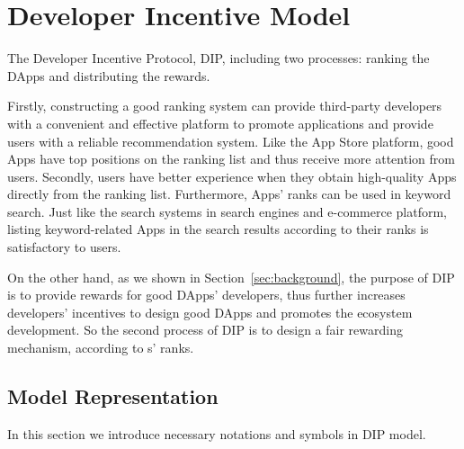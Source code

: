 \section{Developer Incentive Model}
\noindent
The Developer Incentive Protocol, DIP, including two processes: ranking the DApps and distributing the rewards.

Firstly, constructing a good ranking system can provide third-party developers
with a convenient and effective platform to promote applications and provide
users with a reliable recommendation system. Like the App Store platform, good
Apps have top positions on the ranking list and thus receive more attention
from users. Secondly, users have better experience when they obtain
high-quality Apps directly from the ranking list. Furthermore, Apps' ranks can
be used in keyword search. Just like the search systems in search engines and
e-commerce platform,  listing keyword-related Apps in the search results according to their ranks is satisfactory to users.

On the other hand, as we shown in Section~\ref{sec:background}, the purpose of DIP is to provide rewards for good DApps' developers, thus further increases developers' incentives to design good DApps and promotes the ecosystem development. So the second process of DIP is to design a fair rewarding mechanism, according to {\dapp}s' ranks.

\subsection{Model Representation}
\label{subsection:parameters}
\noindent
In this section we introduce necessary notations and symbols in DIP model.

